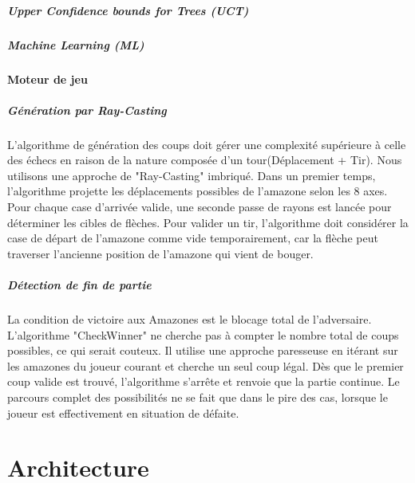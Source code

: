 \documentclass[12pt,a4paper,titlepage,oneside]{article}
\begin{document}
    \subsubsection{Upper Confidence bounds for Trees (UCT)}
    \subsubsection{Machine Learning (ML)}

    \subsection{Moteur de jeu}
        \subsubsection{Génération par Ray-Casting}

        L'algorithme de génération des coups doit gérer une complexité supérieure à celle des échecs en raison de la nature composée d'un tour(Déplacement + Tir). Nous utilisons une approche de "Ray-Casting" imbriqué.
        Dans un premier temps, l'algorithme projette les déplacements possibles de l'amazone selon les 8 axes. Pour chaque case d'arrivée valide, une seconde passe de rayons est lancée pour déterminer les cibles de flèches. Pour valider un tir, l'algorithme doit considérer la case de départ de l'amazone comme vide temporairement, car la flèche peut traverser l'ancienne position de l'amazone qui vient de bouger.

        \subsubsection{Détection de fin de partie}

        La condition de victoire aux Amazones est le blocage total de l'adversaire. L'algorithme "CheckWinner" ne cherche pas à compter le nombre total de coups possibles, ce qui serait couteux. Il utilise une approche paresseuse en itérant sur les amazones du joueur courant et cherche un seul coup légal. Dès que le premier coup valide est trouvé, l'algorithme s'arrête et renvoie que la partie continue. Le parcours complet des possibilités ne se fait que dans le pire des cas, lorsque le joueur est effectivement en situation de défaite.


    \part{Architecture}
\end{document}
